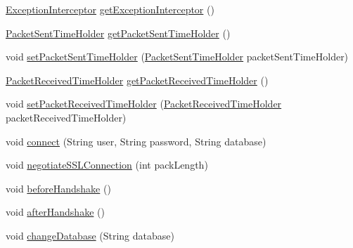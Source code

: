 \begin{DoxyCompactItemize}
\item 
\mbox{\hyperlink{interfacecom_1_1mysql_1_1cj_1_1exceptions_1_1_exception_interceptor}{Exception\+Interceptor}} \mbox{\hyperlink{interfacecom_1_1mysql_1_1cj_1_1protocol_1_1_protocol_a788184c5580bc30795094cefce935156}{get\+Exception\+Interceptor}} ()
\item 
\mbox{\hyperlink{interfacecom_1_1mysql_1_1cj_1_1protocol_1_1_packet_sent_time_holder}{Packet\+Sent\+Time\+Holder}} \mbox{\hyperlink{interfacecom_1_1mysql_1_1cj_1_1protocol_1_1_protocol_a412e8ba9beb161548f142a1178c910d2}{get\+Packet\+Sent\+Time\+Holder}} ()
\item 
void \mbox{\hyperlink{interfacecom_1_1mysql_1_1cj_1_1protocol_1_1_protocol_a7fab6d818df57a243bf9a0b8e41005f2}{set\+Packet\+Sent\+Time\+Holder}} (\mbox{\hyperlink{interfacecom_1_1mysql_1_1cj_1_1protocol_1_1_packet_sent_time_holder}{Packet\+Sent\+Time\+Holder}} packet\+Sent\+Time\+Holder)
\item 
\mbox{\hyperlink{interfacecom_1_1mysql_1_1cj_1_1protocol_1_1_packet_received_time_holder}{Packet\+Received\+Time\+Holder}} \mbox{\hyperlink{interfacecom_1_1mysql_1_1cj_1_1protocol_1_1_protocol_a68bc036cd22a70fe8947ed43339c4fa0}{get\+Packet\+Received\+Time\+Holder}} ()
\item 
void \mbox{\hyperlink{interfacecom_1_1mysql_1_1cj_1_1protocol_1_1_protocol_a764d00412edae6ab570dec2a849e89e3}{set\+Packet\+Received\+Time\+Holder}} (\mbox{\hyperlink{interfacecom_1_1mysql_1_1cj_1_1protocol_1_1_packet_received_time_holder}{Packet\+Received\+Time\+Holder}} packet\+Received\+Time\+Holder)
\item 
void \mbox{\hyperlink{interfacecom_1_1mysql_1_1cj_1_1protocol_1_1_protocol_a62fc4a0bb330ef36eb91217c33b36ab8}{connect}} (String user, String password, String database)
\item 
void \mbox{\hyperlink{interfacecom_1_1mysql_1_1cj_1_1protocol_1_1_protocol_adb74cf66c1d6f69ff114d3d6c45db6dd}{negotiate\+S\+S\+L\+Connection}} (int pack\+Length)
\item 
void \mbox{\hyperlink{interfacecom_1_1mysql_1_1cj_1_1protocol_1_1_protocol_ab775cf8ac0a9bec0df8c4a473c804ae8}{before\+Handshake}} ()
\item 
void \mbox{\hyperlink{interfacecom_1_1mysql_1_1cj_1_1protocol_1_1_protocol_ab5abac8e23590e55ada2b133ce963a5c}{after\+Handshake}} ()
\item 
void \mbox{\hyperlink{interfacecom_1_1mysql_1_1cj_1_1protocol_1_1_protocol_a02558c9b17a492adb2e5b9cb0fb82778}{change\+Database}} (String database)
\item 

\end{DoxyCompactItemize}
